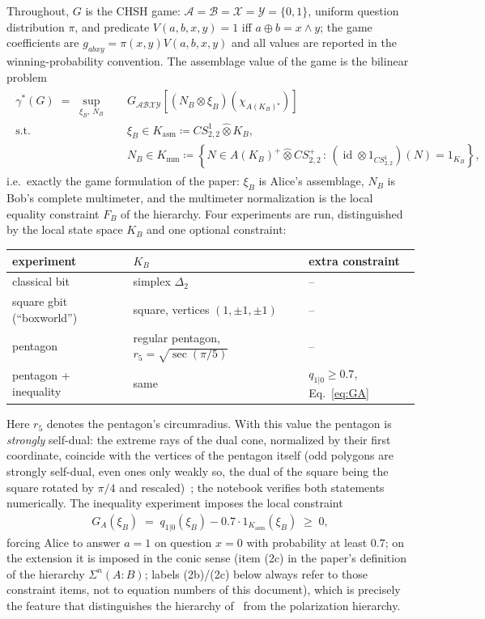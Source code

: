 \documentclass[11pt,a4paper]{article}
\newcommand*{\tmax}{\hat{\otimes}}
\newcommand*{\lrbracket}[1]{\left(#1\right)}
\newcommand*{\Acal}{\mathcal{A}}
\newcommand*{\Bcal}{\mathcal{B}}
\newcommand*{\Xcal}{\mathcal{X}}
\newcommand*{\Ycal}{\mathcal{Y}}
\newcommand*{\Kasm}{K_{\mathrm{asm}}}
\newcommand*{\Kmm}{K_{\mathrm{mm}}}
\theoremstyle{remark}
\begin{document}
Throughout, $G$ is the CHSH game:
$\Acal=\Bcal=\Xcal=\Ycal=\lbrace 0,1\rbrace$, uniform question
distribution $\pi$, and predicate $V(a,b,x,y)=1$ iff $a\oplus b=x\wedge y$;
the game coefficients are $g_{abxy}=\pi(x,y)V(a,b,x,y)$ and all values are
reported in the winning-probability convention. The assemblage value of the
game is the bilinear problem
\begin{align}\label{eq:gamma}
\begin{split}
    \gamma^*(G) \;=\; \sup_{\xi_B,\, N_B}\quad
    & G_{\Acal\Bcal\Xcal\Ycal}\!\left[\lrbracket{N_B\otimes \xi_B}\lrbracket{\chi_{A(K_B)^{\star}}}\right]\\
    \text{s.t.}\quad
    & \xi_B \in \Kasm \coloneqq CS^1_{2,2}\tmax K_B,\\
    & N_B \in \Kmm \coloneqq \left\lbrace N\in A(K_B)^+\tmax CS^+_{2,2} \,:\,
      \lrbracket{\operatorname{id}\otimes 1_{CS^1_{2,2}}}\lrbracket{N}=1_{K_B}\right\rbrace,
\end{split}
\end{align}
i.e.\ exactly the game formulation of the paper: $\xi_B$ is Alice's
assemblage, $N_B$ is Bob's complete multimeter, and the multimeter
normalization is the local equality constraint $F_B$ of the hierarchy. Four
experiments are run, distinguished by the local state space $K_B$ and one
optional constraint:

\begin{center}
\begin{tabular}{lll}
\toprule
experiment & $K_B$ & extra constraint\\
\midrule
classical bit & simplex $\Delta_2$ & --\\
square gbit (``boxworld'') & square, vertices $(1,\pm1,\pm1)$ & --\\
pentagon & regular pentagon, $r_5=\sqrt{\sec(\pi/5)}$ & --\\
pentagon + inequality & same & $q_{1\vert 0}\geq 0.7$, Eq.~\eqref{eq:GA}\\
\bottomrule
\end{tabular}
\end{center}

\noindent
Here $r_5$ denotes the pentagon's circumradius. With this value the
pentagon is \emph{strongly} self-dual: the extreme rays of the dual cone,
normalized by their first coordinate, coincide with the vertices of the
pentagon itself (odd polygons are strongly self-dual, even ones only weakly
so, the dual of the square being the square rotated by $\pi/4$ and
rescaled)~\cite{Janotta2011}; the notebook verifies both statements
numerically. The inequality experiment imposes the local constraint
\begin{align}\label{eq:GA}
    G_A(\xi_B)\;=\; q_{1\vert 0}(\xi_B) - 0.7\cdot 1_{\Kasm}(\xi_B)\;\geq\; 0,
\end{align}
forcing Alice to answer $a=1$ on question $x=0$ with probability
at least $0.7$; on the extension it is imposed in the conic sense
(item (2c) in the paper's definition of the hierarchy $\Sigma^n(A:B)$;
labels (2b)/(2c) below always refer to those constraint items, not to
equation numbers of this document), which is precisely the feature that
distinguishes the hierarchy of~\cite{paper} from the polarization
hierarchy.
\end{document}
